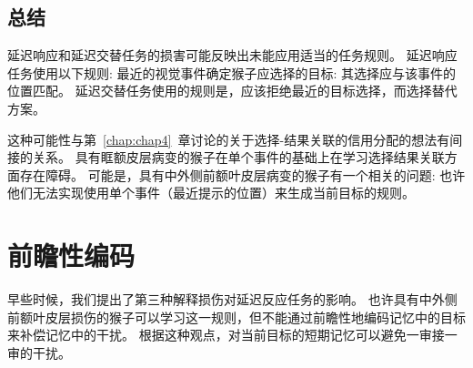 \subsection{总结}

延迟响应和延迟交替任务的损害可能反映出未能应用适当的任务规则。
延迟响应任务使用以下规则: 最近的视觉事件确定猴子应选择的目标: 
其选择应与该事件的位置匹配。
延迟交替任务使用的规则是，应该拒绝最近的目标选择，而选择替代方案。


这种可能性与第~\ref{chap:chap4}~章讨论的关于选择-结果关联的信用分配的想法有间接的关系。
具有眶额皮层病变的猴子在单个事件的基础上在学习选择结果关联方面存在障碍。
可能是，具有中外侧前额叶皮层病变的猴子有一个相关的问题: 
也许他们无法实现使用单个事件（最近提示的位置）来生成当前目标的规则。



\section{前瞻性编码}

早些时候，我们提出了第三种解释损伤对延迟反应任务的影响。
也许具有中外侧前额叶皮层损伤的猴子可以学习这一规则，但不能通过前瞻性地编码记忆中的目标来补偿记忆中的干扰。
根据这种观点，对当前目标的短期记忆可以避免一审接一审的干扰。


